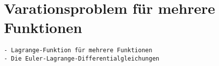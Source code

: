 %
%
%
\section{Varationsproblem für mehrere Funktionen
\label{buch:variation:section:mehrerefunktionen}}

\begin{verbatim}
- Lagrange-Funktion für mehrere Funktionen
- Die Euler-Lagrange-Differentialgleichungen 
\end{verbatim}

